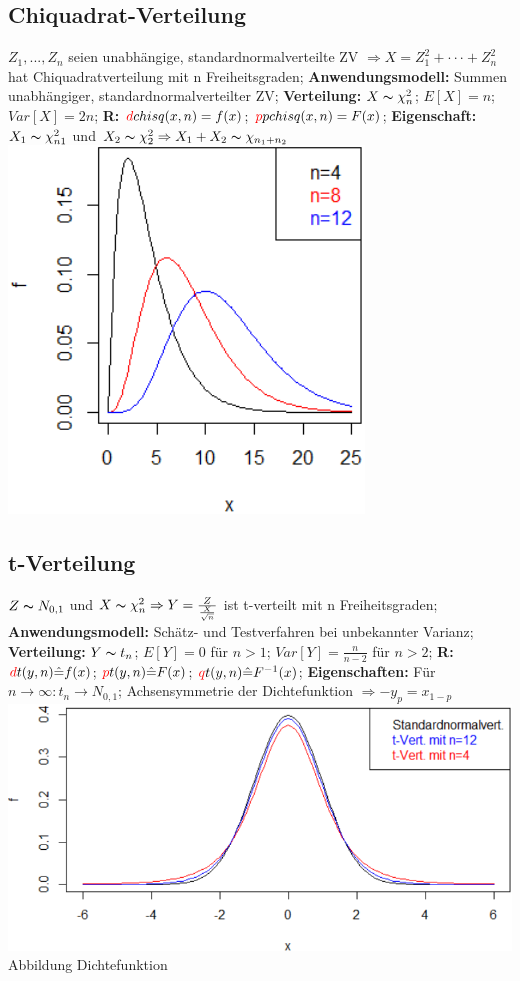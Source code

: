 \subsection{Chiquadrat-Verteilung}
$ Z_{1},...,Z_{n}$ seien unabhängige, standardnormalverteilte ZV $\Rightarrow  X=Z_{1}^2+···+Z_{n}^2 $ hat Chiquadratverteilung mit n Freiheitsgraden;
\textbf{Anwendungsmodell:} 
Summen unabhängiger, standardnormalverteilter ZV;
\textbf{Verteilung:} 
$ X \thicksim  \chi_{n}^2$; 
$ E[X] = n $; 
$ Var[X] = 2n $; 
\textbf{R:} 
$ \textcolor{red}{d} chisq(x,n)=f(x)$; 
$\textcolor{red}{p} pchisq(x,n)=F(x)$; 
\textbf{Eigenschaft:} 
$ X_{1} \thicksim \chi_{n1}^2 $ und $ X_{2} \thicksim \chi_{2}^2 \Rightarrow X_{1} + X_{2} \thicksim \chi_{n_{1} + n_{2}} $
\includegraphics[scale=0.25]{./pic/Chiquadratverteilung.png}
\subsection{t-Verteilung}
$ Z \thicksim N_{0,1} $ und $ X \thicksim \chi_{n}^2 \Rightarrow Y = \frac{Z}{\frac{X}{\sqrt{n}}} $ ist t-verteilt mit n Freiheitsgraden; 
\textbf{Anwendungsmodell:}
Schätz- und Testverfahren bei unbekannter Varianz; 
\textbf{Verteilung:} 
$ Y \thicksim t_{n} $; 
$ E[Y] = 0  $ für $ n > 1 $; 
$ Var[Y] = \frac{n}{n-2} $ für $ n > 2 $; 
\textbf{R:} 
$\textcolor{red}{d}t(y,n) \hat{=} f(x) $; 
$ \textcolor{red}{p}t(y,n) \hat{=} F(x)$; 
$ \textcolor{red}{q}t(y, n) \hat{=} F^{-1}(x)$; 
\textbf{Eigenschaften:} 
Für $ n  \rightarrow \infty : t_{n} \rightarrow N_{0,1}$; 
Achsensymmetrie der Dichtefunktion $ \Rightarrow -y_{p} = x_{1-p} $
\includegraphics[scale=0.25]{./pic/t-Verteilung.png}\\
Abbildung Dichtefunktion